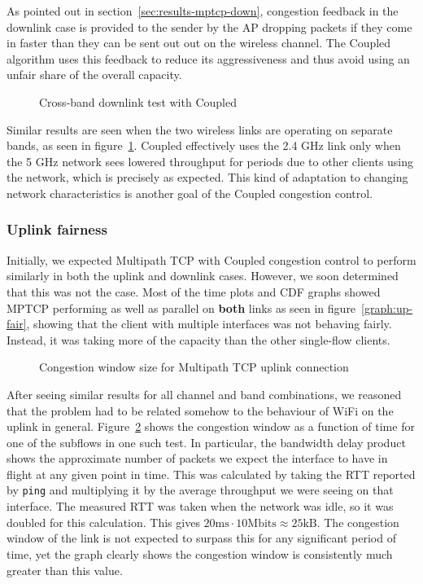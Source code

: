 
As pointed out in section~\ref{sec:results-mptcp-down}, congestion feedback in
the downlink case is provided to the sender by the AP dropping packets if they
come in faster than they can be sent out out on the wireless channel. The
Coupled algorithm uses this feedback to reduce its aggressiveness and thus avoid
using an unfair share of the overall capacity.

\begin{figure}[h]
 \centering
 
 \caption{Cross-band downlink test with Coupled}\label{graph:cb-fairness-down}
\end{figure}

Similar results are seen when the two wireless links are operating on separate
bands, as seen in figure~\ref{graph:cb-fairness-down}. Coupled effectively uses
the 2.4 GHz link only when the 5 GHz network sees lowered throughput for periods
due to other clients using the network, which is precisely as expected. This
kind of adaptation to changing network characteristics is another goal of the
Coupled congestion control.

\subsubsection{Uplink fairness}
Initially, we expected Multipath TCP with Coupled congestion control to perform
similarly in both the uplink and downlink cases. However, we soon determined
that this was not the case. Most of the time plots and CDF graphs showed MPTCP
performing as well as parallel on \textbf{both} links as seen in
figure~\ref{graph:up-fair}, showing that the client with multiple interfaces was
not behaving fairly. Instead, it was taking more of the capacity than the other
single-flow clients.

\begin{figure}[h]
 \centering
 
 \caption{Congestion window size for Multipath TCP uplink connection}\label{graph:fairness-up-close}
\end{figure}

After seeing similar results for all channel and band combinations, we reasoned
that the problem had to be related somehow to the behaviour of WiFi on the
uplink in general. Figure~\ref{graph:fairness-up-close} shows the congestion
window as a function of time for one of the subflows in one such test. In
particular, the bandwidth delay product shows the approximate number of packets
we expect the interface to have in flight at any given point in time. This was
calculated by taking the RTT reported by \texttt{ping} and multiplying it by the
average throughput we were seeing on that interface. The measured RTT was taken
when the network was idle, so it was doubled for this calculation. This gives
$20\text{ms} \cdot 10\text{Mbits} \approx 25\text{kB}$. The congestion window of
the link is not expected to surpass this for any significant period of time, yet
the graph clearly shows the congestion window is consistently much greater than
this value.


